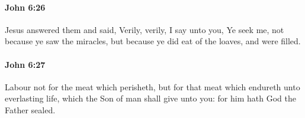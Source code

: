 		\paragraph{John 6:26} %
			\label{JOHN-6-26}

			Jesus answered them and said, Verily, verily, I say unto you, Ye seek me, not because ye saw the miracles, but because ye did eat of the loaves, and were filled.

			\begin{framed}
			\scriptsize
				\begin{compactdesc}
					\item[SBLG] 
				\end{compactdesc}
			\end{framed}

		\paragraph{John 6:27} %
			\label{JOHN-6-27}

			Labour not for the meat which perisheth, but for that meat which endureth unto everlasting life, which the Son of man shall give unto you: for him hath God the Father sealed.

